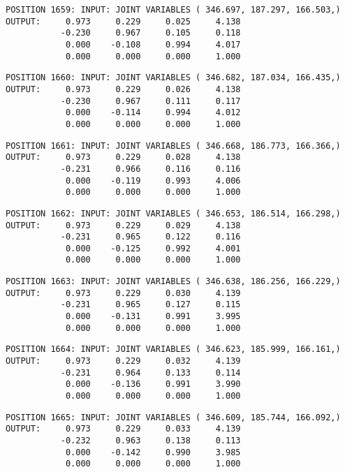 \begin{verbatim}
POSITION 1659: INPUT: JOINT VARIABLES ( 346.697, 187.297, 166.503,)
OUTPUT:     0.973     0.229     0.025     4.138
           -0.230     0.967     0.105     0.118
            0.000    -0.108     0.994     4.017
            0.000     0.000     0.000     1.000
\end{verbatim} \pagebreak[1]\begin{verbatim}
POSITION 1660: INPUT: JOINT VARIABLES ( 346.682, 187.034, 166.435,)
OUTPUT:     0.973     0.229     0.026     4.138
           -0.230     0.967     0.111     0.117
            0.000    -0.114     0.994     4.012
            0.000     0.000     0.000     1.000
\end{verbatim} \pagebreak[1]\begin{verbatim}
POSITION 1661: INPUT: JOINT VARIABLES ( 346.668, 186.773, 166.366,)
OUTPUT:     0.973     0.229     0.028     4.138
           -0.231     0.966     0.116     0.116
            0.000    -0.119     0.993     4.006
            0.000     0.000     0.000     1.000
\end{verbatim} \pagebreak[1]\begin{verbatim}
POSITION 1662: INPUT: JOINT VARIABLES ( 346.653, 186.514, 166.298,)
OUTPUT:     0.973     0.229     0.029     4.138
           -0.231     0.965     0.122     0.116
            0.000    -0.125     0.992     4.001
            0.000     0.000     0.000     1.000
\end{verbatim} \pagebreak[1]\begin{verbatim}
POSITION 1663: INPUT: JOINT VARIABLES ( 346.638, 186.256, 166.229,)
OUTPUT:     0.973     0.229     0.030     4.139
           -0.231     0.965     0.127     0.115
            0.000    -0.131     0.991     3.995
            0.000     0.000     0.000     1.000
\end{verbatim} \pagebreak[1]\begin{verbatim}
POSITION 1664: INPUT: JOINT VARIABLES ( 346.623, 185.999, 166.161,)
OUTPUT:     0.973     0.229     0.032     4.139
           -0.231     0.964     0.133     0.114
            0.000    -0.136     0.991     3.990
            0.000     0.000     0.000     1.000
\end{verbatim} \pagebreak[1]\begin{verbatim}
POSITION 1665: INPUT: JOINT VARIABLES ( 346.609, 185.744, 166.092,)
OUTPUT:     0.973     0.229     0.033     4.139
           -0.232     0.963     0.138     0.113
            0.000    -0.142     0.990     3.985
            0.000     0.000     0.000     1.000
\end{verbatim} \pagebreak[1]\begin{verbatim}

\end{verbatim}
